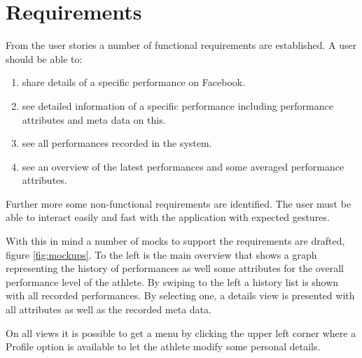 \chapter{Requirements}
From the user stories a number of functional requirements are established.
A user should be able to:

\begin{enumerate}
	\item share details of a specific performance on Facebook.
	\item see detailed information of a specific performance including performance attributes and meta data on this.
	\item see all performances recorded in the system.
	\item see an overview of the latest performances and some averaged performance attributes.
\end{enumerate}

Further more some non-functional requirements are identified. The user must be able to interact easily and fast with the application with expected gestures.

With this in mind a number of mocks to support the requirements are drafted, figure \ref{fig:mockups}. To the left is the main overview that shows a graph representing the history of performances as well some attributes for the overall performance level of the athlete. By swiping to the left a history list is shown with all recorded performances. By selecting one, a details view is presented with all attributes as well as the recorded meta data.

On all views it is possible to get a menu by clicking the upper left corner where a Profile option is available to let the athlete modify some personal details.


